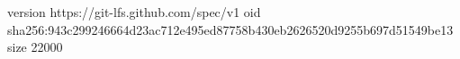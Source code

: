 version https://git-lfs.github.com/spec/v1
oid sha256:943c299246664d23ac712e495ed87758b430eb2626520d9255b697d51549be13
size 22000
